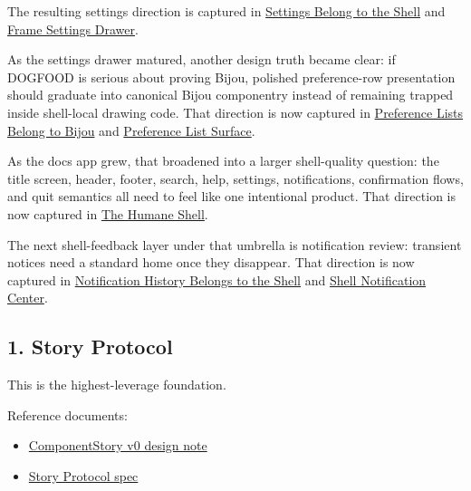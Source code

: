 The resulting settings direction is captured in \href{https://github.com/flyingrobots/bijou/blob/cbd70612140e7a450d764b3c7be1c6af878b99bc/docs/strategy/settings-belong-to-the-shell.md}{Settings Belong to the Shell} and \href{https://github.com/flyingrobots/bijou/blob/cbd70612140e7a450d764b3c7be1c6af878b99bc/docs/specs/frame-settings-drawer.spec.json}{Frame Settings Drawer}.

As the settings drawer matured, another design truth became clear: if DOGFOOD is serious about proving Bijou, polished preference-row presentation should graduate into canonical Bijou componentry instead of remaining trapped inside shell-local drawing code. That direction is now captured in \href{https://github.com/flyingrobots/bijou/blob/cbd70612140e7a450d764b3c7be1c6af878b99bc/docs/strategy/preference-lists-belong-to-bijou.md}{Preference Lists Belong to Bijou} and \href{https://github.com/flyingrobots/bijou/blob/cbd70612140e7a450d764b3c7be1c6af878b99bc/docs/specs/preference-list-surface.spec.json}{Preference List Surface}.

As the docs app grew, that broadened into a larger shell-quality question: the title screen, header, footer, search, help, settings, notifications, confirmation flows, and quit semantics all need to feel like one intentional product. That direction is now captured in \href{https://github.com/flyingrobots/bijou/blob/cbd70612140e7a450d764b3c7be1c6af878b99bc/docs/strategy/humane-shell.md}{The Humane Shell}.

The next shell-feedback layer under that umbrella is notification review: transient notices need a standard home once they disappear. That direction is now captured in \href{https://github.com/flyingrobots/bijou/blob/cbd70612140e7a450d764b3c7be1c6af878b99bc/docs/strategy/notification-history-belongs-to-the-shell.md}{Notification History Belongs to the Shell} and \href{https://github.com/flyingrobots/bijou/blob/cbd70612140e7a450d764b3c7be1c6af878b99bc/docs/specs/shell-notification-center.spec.json}{Shell Notification Center}.

\subsection{1. Story Protocol}\label{record-042-story-protocol}

This is the highest-leverage foundation.

Reference documents:

\begin{itemize}
\tightlist
\item
  \href{https://github.com/flyingrobots/bijou/blob/cbd70612140e7a450d764b3c7be1c6af878b99bc/docs/strategy/component-story-v0.md}{ComponentStory v0 design note}
\item
  \href{https://github.com/flyingrobots/bijou/blob/cbd70612140e7a450d764b3c7be1c6af878b99bc/docs/specs/story-protocol.spec.json}{Story Protocol spec}
\end{itemize}

